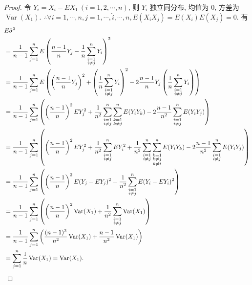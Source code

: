 \documentclass[color=black,device=normal,lang=cn]{elegantnote}
\numberwithin{equation}{section}
\theoremstyle{plain}
\numberwithin{exercise}{exsection}
\begin{document}
\begin{proof}
    令 $Y_i=X_i-EX_1\ (i=1,2,\cdots,n)$, 则 $Y_i$ 独立同分布, 均值为 $0$, 方差为 $\operatorname{Var}(X_1)$. $\therefore\forall i=1,\cdots,n,j=1,\cdots,\hat{i},\cdots,n,E(X_iX_j)=E(X_i)E(X_j)=0$. 有
    \begin{align*}
        & E\hat{\sigma}^2 \\
        & =\dfrac{1}{n-1}\sum\limits_{j=1}^nE\left(\dfrac{n-1}{n}Y_j-\dfrac{1}{n}\sum\limits_{\substack{i=1\\i\neq j}}^nY_i\right)^2 \\
        & =\dfrac{1}{n-1}\sum\limits_{j=1}^nE\left(\left(\dfrac{n-1}{n}Y_j\right)^2+\left(\dfrac{1}{n}\sum\limits_{\substack{i=1\\i\neq j}}^nY_i\right)^2-2\dfrac{n-1}{n}Y_j\left(\dfrac{1}{n}\sum\limits_{\substack{i=1\\i\neq j}}^nY_i\right)\right) \\
        & =\dfrac{1}{n-1}\sum\limits_{j=1}^n\left(\left(\dfrac{n-1}{n}\right)^2EY_j^2+\dfrac{1}{n^2}\sum\limits_{\substack{i=1\\i\neq j}}^n\sum\limits_{\substack{k=1\\k\neq j}}^nE(Y_iY_k)-2\dfrac{n-1}{n^2}\sum\limits_{\substack{i=1\\i\neq j}}^nE(Y_iY_j)\right) \\
        & =\dfrac{1}{n-1}\sum\limits_{j=1}^n\left(\left(\dfrac{n-1}{n}\right)^2EY_j^2+\dfrac{1}{n^2}\sum\limits_{\substack{i=1\\i\neq j}}^nEY_i^2+\dfrac{1}{n^2}\sum\limits_{\substack{i=1\\i\neq j}}^n\sum\limits_{\substack{k=1\\k\neq j\\k\neq i}}^nE(Y_iY_k)-2\dfrac{n-1}{n^2}\sum\limits_{\substack{i=1\\i\neq j}}^nE(Y_iY_j)\right) \\
        & =\dfrac{1}{n-1}\sum\limits_{j=1}^n\left(\left(\dfrac{n-1}{n}\right)^2E(Y_j-EY_j)^2+\dfrac{1}{n^2}\sum\limits_{\substack{i=1\\i\neq j}}^nE(Y_i-EY_i)^2\right) \\
        & =\dfrac{1}{n-1}\sum\limits_{j=1}^n\left(\left(\dfrac{n-1}{n}\right)^2\operatorname{Var}(X_1)+\dfrac{1}{n^2}\sum\limits_{\substack{i=1\\i\neq j}}^n\operatorname{Var}(X_1)\right) \\
        & =\dfrac{1}{n-1}\sum\limits_{j=1}^n\left(\dfrac{(n-1)^2}{n^2}\operatorname{Var}(X_1)+\dfrac{n-1}{n^2}\operatorname{Var}(X_1)\right) \\
        & =\sum\limits_{j=1}^n\dfrac{1}{n}\operatorname{Var}(X_1)=\operatorname{Var}(X_1).\qedhere
    \end{align*}
\end{proof}
\end{document}
